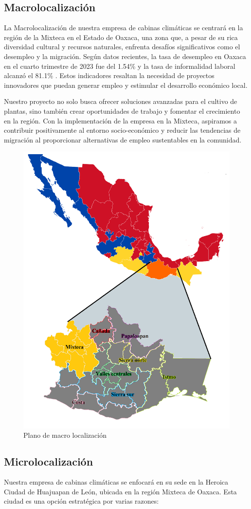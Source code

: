 \subsection{Macrolocalización}
La Macrolocalización de nuestra empresa de cabinas climáticas se centrará en la región de la Mixteca en el Estado de Oaxaca, una zona que, a pesar de su rica diversidad cultural y recursos naturales, enfrenta desafíos significativos como el desempleo y la migración. Según datos recientes, la tasa de desempleo en Oaxaca en el cuarto trimestre de 2023 fue del 1.54\% y la tasa de informalidad laboral alcanzó el 81.1\% \cite{DataMexico2023}. Estos indicadores resaltan la necesidad de proyectos innovadores que puedan generar empleo y estimular el desarrollo económico local.

Nuestro proyecto no solo busca ofrecer soluciones avanzadas para el cultivo de plantas, sino también crear oportunidades de trabajo y fomentar el crecimiento en la región. Con la implementación de la empresa en la Mixteca, aspiramos a contribuir positivamente al entorno socio-económico y reducir las tendencias de migración al proporcionar alternativas de empleo sustentables en la comunidad.

\begin{figure}[H]
    \centering	
    \includegraphics[width=.6\textwidth]{img/macrolocalizacion.png} 
    \caption{Plano de macro localización}
\label{fig:macrolocalizacion}
\end{figure}


\newpage


\subsection{Microlocalización}
Nuestra empresa de cabinas climáticas se enfocará en su sede en la Heroica Ciudad de Huajuapan de León, ubicada en la región Mixteca de Oaxaca. Esta ciudad es una opción estratégica por varias razones:

